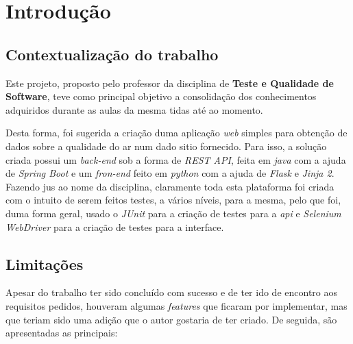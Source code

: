 
\chapter{Introdução}

\section{Contextualização do trabalho}
Este projeto, proposto pelo professor da disciplina de \textbf{Teste e Qualidade de Software}, teve como
principal objetivo a consolidação dos conhecimentos adquiridos durante as aulas da mesma tidas até ao momento.

Desta forma, foi sugerida a criação duma aplicação \textit{web} simples para obtenção de dados sobre a 
qualidade do ar num dado sitio fornecido. Para isso, a solução criada possui um \textit{back-end} sob a forma de 
\textit{REST API}, feita em \textit{java} com a ajuda de \textit{Spring Boot} e um \textit{fron-end} feito em 
\textit{python} com a ajuda de \textit{Flask} e \textit{Jinja 2}. Fazendo jus ao nome da disciplina, claramente
toda esta plataforma foi criada com o intuito de serem feitos testes, a vários níveis, para a mesma, pelo que foi,
duma forma geral, usado o \textit{JUnit} para a criação de testes para a \textit{api} e \textit{Selenium WebDriver}
para a criação de testes para a interface.

\section{Limitações}
Apesar do trabalho ter sido concluído com sucesso e de ter ido de encontro aos requisitos pedidos, 
houveram algumas \textit{features} que ficaram por implementar, mas que teriam sido uma adição que o autor
gostaria de ter criado. De seguida, são apresentadas as principais:

